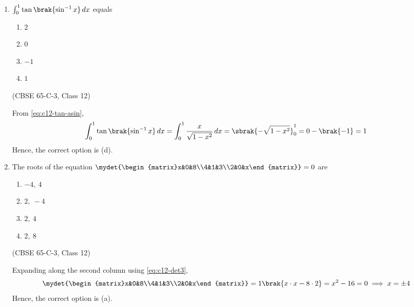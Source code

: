 \begin{enumerate}[label=\thesubsection.\arabic*., ref=\thesubsection.\theenumi]
\begin{center}
\end{center}
 
\setcounter{enumi}{8}
\item $\int_0^1 \tan\brak{\sin^{-1}x}\,dx$ equals
\begin{enumerate}
\item $2$
\item $0$
\item $-1$
\item $1$
\end{enumerate}
\hfill (CBSE 65-C-3, Class 12)
 
\solution From \eqref{eq:c12-tan-asin},
\begin{align}
\int_0^1 \tan\brak{\sin^{-1}x}\,dx = \int_0^1 \frac{x}{\sqrt{1-x^2}}\,dx
= \sbrak{-\sqrt{1-x^2}}_0^1 = 0-\brak{-1} = 1
\end{align}
Hence, the correct option is (d).
 
\begin{center}
\end{center}
 
\item The roots of the equation $\mydet{\begin{matrix}x&0&8\\4&1&3\\2&0&x\end{matrix}}=0$ are
\begin{enumerate}
\item $-4,\ 4$
\item $2,\ -4$
\item $2,\ 4$
\item $2,\ 8$
\end{enumerate}
\hfill (CBSE 65-C-3, Class 12)
 
\solution Expanding along the second column using \eqref{eq:c12-det3},
\begin{align}
\mydet{\begin{matrix}x&0&8\\4&1&3\\2&0&x\end{matrix}}
= 1\brak{x\cdot x-8\cdot 2} = x^2-16 = 0
\implies x = \pm 4
\end{align}
Hence, the correct option is (a).
 
\begin{center}
\end{center}
 

\end{enumerate}
